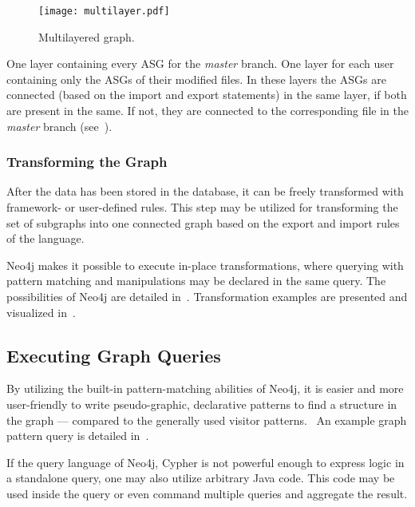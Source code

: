 \begin{figure}[!htb]
  \centering
  \texttt{[image: multilayer.pdf]}
  \caption{Multilayered graph.}
  \label{fig:multilayered-graph}
\end{figure}

One layer containing every ASG for the \emph{master} branch. One layer for each user containing only the ASGs of their modified files. In these layers the ASGs are connected (based on the import and export statements) in the same layer, if both are present in the same. If not, they are connected to the corresponding file in the \emph{master} branch (see~).

\subsubsection{Transforming the Graph}
After the data has been stored in the database, it can be freely transformed with framework- or user-defined rules. This step may be utilized for transforming the set of subgraphs into one connected graph based on the export and import rules of the language.

Neo4j makes it possible to execute in-place transformations, where querying with pattern matching and manipulations may be declared in the same query. The possibilities of Neo4j are detailed in~. Transformation examples are presented and visualized in~.

\subsection{Executing Graph Queries}
By utilizing the built-in pattern-matching abilities of Neo4j, it is easier and more user-friendly to write pseudo-graphic, declarative patterns to find a structure in the graph --- compared to the generally used visitor patterns.~\cite{csmr} An example graph pattern query is detailed in~.

If the query language of Neo4j, Cypher is not powerful enough to express logic in a standalone query, one may also utilize arbitrary Java code. This code may be used inside the query or even command multiple queries and aggregate the result.
